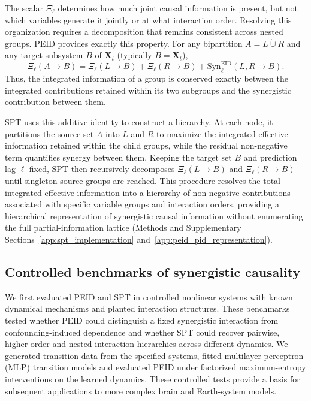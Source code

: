 \documentclass[fleqn,10pt]{wlscirep}
\newcommand{\rev}[1]{\textcolor{red}{#1}}
\theoremstyle{naturetheorem}
\begin{document}
The scalar \(\Xi_{\ell}\) determines how much joint causal information is present, but not which variables generate it jointly or at what interaction order. Resolving this organization requires a decomposition that remains consistent across nested groups. PEID provides exactly this property. For any bipartition \(A=L\mathbin{\dot\cup}R\) and any target subsystem \(B\) of \(\mathbf{X}_t\) (typically \(B=\mathbf{X}_t\)),
\begin{equation}
\Xi_{\ell}(A\rightarrow B)
=
\Xi_{\ell}(L\rightarrow B)
+\Xi_{\ell}(R\rightarrow B)
+\mathrm{Syn}_{\ell}^{\mathrm{EID}}(L,R\rightarrow B).
\end{equation}
Thus, the integrated information of a group is conserved exactly between the integrated contributions retained within its two subgroups and the synergistic contribution between them.

SPT uses this additive identity to construct a hierarchy. At each node, it partitions the source set $A$ into $L$ and $R$ to maximize the integrated effective information retained within the child groups, while the residual non-negative term quantifies synergy between them. Keeping the target set $B$ and prediction lag $\ell$ fixed, SPT then recursively decomposes $\Xi_\ell(L\to B)$ and $\Xi_\ell(R\to B)$ until singleton source groups are reached. This procedure resolves the total integrated effective information into a hierarchy of non-negative contributions associated with specific variable groups and interaction orders, providing a hierarchical representation of synergistic causal information without enumerating the full partial-information lattice (Methods and Supplementary Sections~\ref{app:spt_implementation} and~\ref{app:peid_pid_representation}).


\subsection*{Controlled benchmarks of synergistic causality}


We first evaluated PEID and SPT in controlled nonlinear systems with known dynamical mechanisms and planted interaction structures. These benchmarks tested whether PEID could distinguish a fixed synergistic interaction from confounding-induced dependence and whether SPT could recover pairwise, higher-order and nested interaction hierarchies across different dynamics. We generated transition data from the specified systems, fitted multilayer perceptron (MLP) transition models and evaluated PEID under factorized maximum-entropy interventions on the learned dynamics. These controlled tests provide a basis for subsequent applications to more complex brain and Earth-system models.
\end{document}
